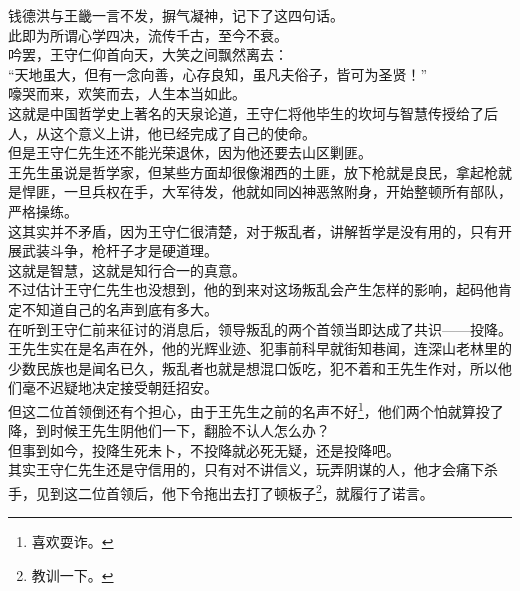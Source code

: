 \begin{multicols}{\theparacolNo}
钱德洪与王畿一言不发，摒气凝神，记下了这四句话。\\

此即为所谓心学四决，流传千古，至今不衰。\\

吟罢，王守仁仰首向天，大笑之间飘然离去：\\

“天地虽大，但有一念向善，心存良知，虽凡夫俗子，皆可为圣贤！”\\

嚎哭而来，欢笑而去，人生本当如此。\\

这就是中国哲学史上著名的天泉论道，王守仁将他毕生的坎坷与智慧传授给了后人，从这个意义上讲，他已经完成了自己的使命。\\

但是王守仁先生还不能光荣退休，因为他还要去山区剿匪。\\

王先生虽说是哲学家，但某些方面却很像湘西的土匪，放下枪就是良民，拿起枪就是悍匪，一旦兵权在手，大军待发，他就如同凶神恶煞附身，开始整顿所有部队，严格操练。\\

这其实并不矛盾，因为王守仁很清楚，对于叛乱者，讲解哲学是没有用的，只有开展武装斗争，枪杆子才是硬道理。\\

这就是智慧，这就是知行合一的真意。\\

不过估计王守仁先生也没想到，他的到来对这场叛乱会产生怎样的影响，起码他肯定不知道自己的名声到底有多大。\\

在听到王守仁前来征讨的消息后，领导叛乱的两个首领当即达成了共识——投降。\\

王先生实在是名声在外，他的光辉业迹、犯事前科早就街知巷闻，连深山老林里的少数民族也是闻名已久，叛乱者也就是想混口饭吃，犯不着和王先生作对，所以他们毫不迟疑地决定接受朝廷招安。\\

但这二位首领倒还有个担心，由于王先生之前的名声不好\footnote{喜欢耍诈。}，他们两个怕就算投了降，到时候王先生阴他们一下，翻脸不认人怎么办？\\

但事到如今，投降生死未卜，不投降就必死无疑，还是投降吧。\\

其实王守仁先生还是守信用的，只有对不讲信义，玩弄阴谋的人，他才会痛下杀手，见到这二位首领后，他下令拖出去打了顿板子\footnote{教训一下。}，就履行了诺言。\\


\end{multicols}

